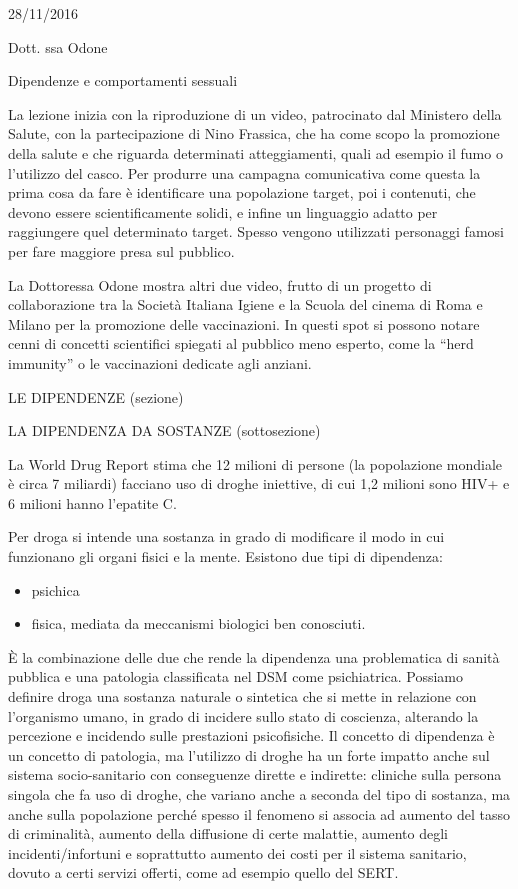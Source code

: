 \documentclass[]{article}
\date{}
\begin{document}
28/11/2016

Dott. ssa Odone

Dipendenze e comportamenti sessuali

La lezione inizia con la riproduzione di un video, patrocinato dal
Ministero della Salute, con la partecipazione di Nino Frassica, che ha
come scopo la promozione della salute e che riguarda determinati
atteggiamenti, quali ad esempio il fumo o l'utilizzo del casco. Per
produrre una campagna comunicativa come questa la prima cosa da fare è
identificare una popolazione target, poi i contenuti, che devono essere
scientificamente solidi, e infine un linguaggio adatto per raggiungere
quel determinato target. Spesso vengono utilizzati personaggi famosi per
fare maggiore presa sul pubblico.

La Dottoressa Odone mostra altri due video, frutto di un progetto di
collaborazione tra la Società Italiana Igiene e la Scuola del cinema di
Roma e Milano per la promozione delle vaccinazioni. In questi spot si
possono notare cenni di concetti scientifici spiegati al pubblico meno
esperto, come la ``herd immunity'' o le vaccinazioni dedicate agli
anziani.

LE DIPENDENZE (sezione)

LA DIPENDENZA DA SOSTANZE (sottosezione)

La World Drug Report stima che 12 milioni di persone (la popolazione
mondiale è circa 7 miliardi) facciano uso di droghe iniettive, di cui
1,2 milioni sono HIV+ e 6 milioni hanno l'epatite C.

Per droga si intende una sostanza in grado di modificare il modo in cui
funzionano gli organi fisici e la mente. Esistono due tipi di
dipendenza:

\begin{itemize}
\item
  psichica
\item
  fisica, mediata da meccanismi biologici ben conosciuti.
\end{itemize}

È la combinazione delle due che rende la dipendenza una problematica di
sanità pubblica e una patologia classificata nel DSM come psichiatrica.
Possiamo definire droga una sostanza naturale o sintetica che si mette
in relazione con l'organismo umano, in grado di incidere sullo stato di
coscienza, alterando la percezione e incidendo sulle prestazioni
psicofisiche. Il concetto di dipendenza è un concetto di patologia, ma
l'utilizzo di droghe ha un forte impatto anche sul sistema
socio-sanitario con conseguenze dirette e indirette: cliniche sulla
persona singola che fa uso di droghe, che variano anche a seconda del
tipo di sostanza, ma anche sulla popolazione perché spesso il fenomeno
si associa ad aumento del tasso di criminalità, aumento della diffusione
di certe malattie, aumento degli incidenti/infortuni e soprattutto
aumento dei costi per il sistema sanitario, dovuto a certi servizi
offerti, come ad esempio quello del SERT.
\end{document}
